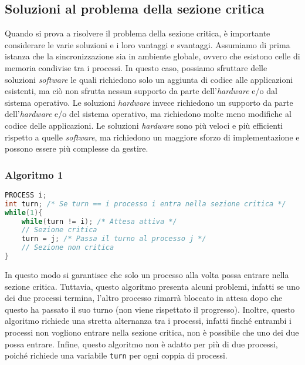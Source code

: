     \subsection{Soluzioni al problema della sezione critica}
        Quando si prova a risolvere il problema della sezione critica, è importante considerare le varie soluzioni e i loro vantaggi e svantaggi. Assumiamo di prima istanza che la sincronizzazione sia in ambiente globale, ovvero che esistono celle di memoria condivise tra i processi. In questo caso, possiamo sfruttare delle soluzioni \textit{software} le quali richiedono solo un aggiunta di codice alle applicazioni esistenti, ma ciò non sfrutta nessun supporto da parte dell'\textit{hardware} e/o dal sistema operativo. Le soluzioni \textit{hardware} invece richiedono un supporto da parte dell'\textit{hardware} e/o del sistema operativo, ma richiedono molte meno modifiche al codice delle applicazioni. Le soluzioni \textit{hardware} sono più veloci e più efficienti rispetto a quelle \textit{software}, ma richiedono un maggiore sforzo di implementazione e possono essere più complesse da gestire.


        \subsubsection{Algoritmo 1}
        \begin{lstlisting}[language=C]
PROCESS i;
int turn; /* Se turn == i processo i entra nella sezione critica */
while(1){
    while(turn != i); /* Attesa attiva */
    // Sezione critica
    turn = j; /* Passa il turno al processo j */
    // Sezione non critica
}
\end{lstlisting}
        In questo modo si garantisce che solo un processo alla volta possa entrare nella sezione critica. Tuttavia, questo algoritmo presenta alcuni problemi, infatti se uno dei due processi termina, l'altro processo rimarrà bloccato in attesa dopo che questo ha passato il suo turno (non viene rispettato il progresso). Inoltre, questo algoritmo richiede una stretta alternanza tra i processi, infatti finché entrambi i processi non vogliono entrare nella sezione critica, non è possibile che uno dei due possa entrare. Infine, questo algoritmo non è adatto per più di due processi, poiché richiede una variabile \texttt{turn} per ogni coppia di processi.